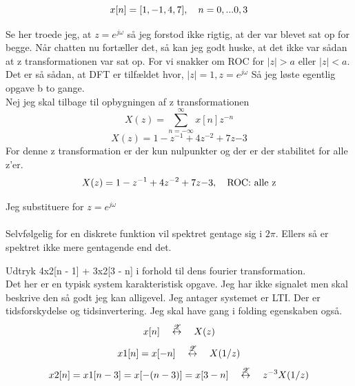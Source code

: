 \begin{EksamensOpgaver}
\begin{Eksamenssæt}[2021 - Rettet]
\begin{eksamensOpgave}
        \end{eksamensOpgave}
        \clearpage
        \begin{eksamensOpgave}
            \[x[n] = [1, -1, 4, 7], \tab{0} n = 0, ...0, 3\]
            \begin{UnderOpgave}
                \color{teal}Se her troede jeg, at $z = e^{j\omega}$ så jeg forstod ikke rigtig, at der var blevet sat op for begge.
                Når chatten nu fortæller det, så kan jeg godt huske, at det ikke var sådan at z transformationen var sat op. 
                For vi snakker om ROC for $|z| > a$ eller $|z| < a$. Det er så sådan, at DFT er tilfældet hvor, $|z| = 1, z = e^{j\omega}$
                Så jeg løste egentlig opgave b to gange. \\
                Nej jeg skal tilbage til opbygningen af z transformationen\color{black}
                \[X(z)=\sum_{n=-\infty}^{\infty}x[n]z^{-n}\]
                \[X(z) = 1 - z^{-1} + 4z^{-2} + 7z{-3}\]
                For denne z transformation er der kun nulpunkter og der er der stabilitet for alle z'er.\\
                \[X(z) = 1 - z^{-1} + 4z^{-2} + 7z{-3}, \tab{0} \text{ROC: alle z}\]
            \end{UnderOpgave} 
            \begin{UnderOpgave}            
                Jeg substituere for $z = e^{j\omega}$ 
                \\\\
                Selvfølgelig for en diskrete funktion vil spektret gentage sig i $2\pi$. Ellers så er spektret ikke mere gentagende end det.
            \end{UnderOpgave}
            \begin{UnderOpgave}
                Udtryk 4x2[n - 1] + 3x2[3 - n] i forhold til dens fourier transformation. \\
                Det her er en typisk system karakteristisk opgave. Jeg har ikke signalet men skal beskrive den så godt jeg kan alligevel.
                Jeg antager systemet er LTI. Der er tidsforskydelse og tidsinvertering.
                Jeg skal have gang i folding egenskaben også. 
                \[x[n] \transformation{Z} X(z)\]
                \[x1[n] = x[-n] \transformation{Z} X(1/z)\]
                \[x2[n] = x1[n - 3] = x[-(n - 3)] = x[3 - n] \transformation{Z} z^{-3}X(1/z)\]

\end{UnderOpgave}
\end{eksamensOpgave}
\end{Eksamenssæt}
\end{EksamensOpgaver}
